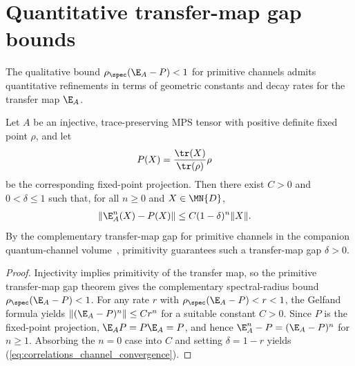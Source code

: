 \section{Quantitative transfer-map gap bounds}

The qualitative bound $\rho_{\spec}(\E_A-P)<1$ for primitive channels
\cite[``Complementary transfer-map gap for primitive maps'']{QICLean2026Blueprint}
admits quantitative refinements in terms of geometric constants and decay rates
for the transfer map $\E_A$.

\begin{lemma}%
    \label{thm:exponential_convergence_primitive}
    \leanok
    Let $A$ be an injective, trace-preserving MPS tensor with positive
    definite fixed point $\rho$, and let
    \begin{align}
        P(X)
         & = \frac{\tr(X)}{\tr(\rho)}\rho
        \label{eq:correlations_fixed_point_projection}
    \end{align}
    be the corresponding fixed-point projection.
    Then there exist $C > 0$ and $0 < \delta \le 1$ such that, for all
    $n\ge 0$ and $X\in\MN{D}$,
    \begin{align}
        \|\E_A^n(X)-P(X)\|
         & \le C(1-\delta)^n\|X\|.
        \label{eq:correlations_channel_convergence}
    \end{align}
    By the complementary transfer-map gap for primitive channels in the companion
    quantum-channel volume~\cite[``Complementary transfer-map gap for primitive maps'']{QICLean2026Blueprint},
    primitivity guarantees such a transfer-map gap $\delta>0$.
\end{lemma}

\begin{proof}
    \leanok
    Injectivity implies primitivity of the transfer map, so the primitive
    transfer-map gap theorem gives the complementary spectral-radius bound
    $\rho_{\spec}(\E_A-P)<1$. For any rate $r$ with $\rho_{\spec}(\E_A-P)<r<1$,
    the Gelfand formula yields $\|(\E_A-P)^n\|\le Cr^n$ for a suitable constant
    $C>0$. Since $P$ is the fixed-point projection, $\E_A P=P\E_A=P$, and hence
    $\E_A^n-P=(\E_A-P)^n$ for $n\ge 1$. Absorbing the $n=0$ case into $C$ and
    setting $\delta=1-r$ yields (\ref{eq:correlations_channel_convergence}).
\end{proof}

